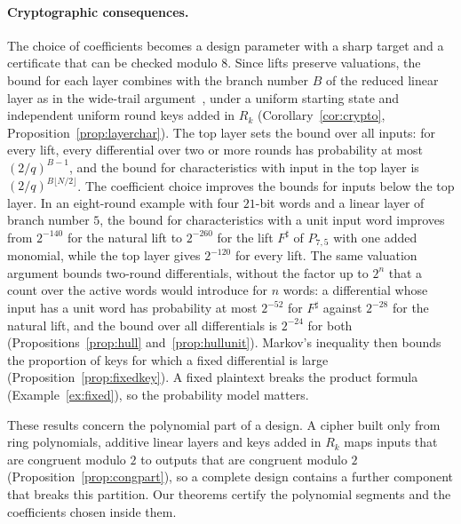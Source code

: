 \documentclass[11pt]{article}
\theoremstyle{definition}
\theoremstyle{remark}
\begin{document}
\paragraph{Cryptographic consequences.}
The choice of coefficients becomes a design parameter with a sharp target and a certificate that can be checked
modulo $8$. Since lifts preserve valuations, the bound for each layer combines with the branch number $B$ of the reduced
linear layer as in the wide-trail argument~\cite{DRwide,DR}, under a uniform starting state and independent uniform round
keys added in $R_k$ (Corollary~\ref{cor:crypto}, Proposition~\ref{prop:layerchar}). The top layer sets the bound over
all inputs: for every lift, every differential over two or more rounds has probability at most $(2/q)^{B-1}$, and the
bound for characteristics with input in the top layer is $(2/q)^{B\lfloor N/2\rfloor}$. The coefficient choice improves the
bounds for inputs below the top layer. In an eight-round example with four $21$-bit words and a linear layer of branch
number $5$, the bound for characteristics with a unit input word improves from $2^{-140}$ for the natural lift to
$2^{-260}$ for the lift $F^\sharp$ of $P_{7,5}$ with one added monomial, while the top layer gives $2^{-120}$ for every
lift. The same valuation argument bounds two-round differentials, without the factor up to $2^n$ that a count over the
active words would introduce for $n$ words: a differential whose input has a unit word has probability at most
$2^{-52}$ for $F^\sharp$ against $2^{-28}$ for the natural lift, and the bound over all differentials is $2^{-24}$ for
both (Propositions~\ref{prop:hull} and~\ref{prop:hullunit}). Markov's inequality then bounds the proportion of keys for
which a fixed differential is large (Proposition~\ref{prop:fixedkey}). A fixed plaintext breaks the product formula
(Example~\ref{ex:fixed}), so the probability model matters.

These results concern the polynomial part of a design. A cipher built only from ring polynomials, additive linear layers
and keys added in $R_k$ maps inputs that are congruent modulo $2$ to outputs that are congruent modulo $2$
(Proposition~\ref{prop:congpart}), so a complete design contains a further component that breaks this partition. Our theorems certify the polynomial segments and the coefficients
chosen inside them.
\end{document}
